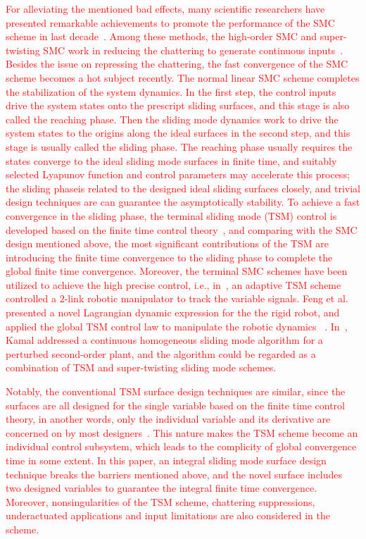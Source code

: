 \documentclass[3p]{elsarticle}
\theoremstyle{plain}
\theoremstyle{remark}
\begin{document}
\textcolor{red}{For alleviating the mentioned bad effects, many scientific researchers have presented remarkable achievements to promote the performance of the SMC scheme in last decade~\cite{zong2013quasi,santiesteban2013time,mu2015continuous,evangelista2013lyapunov,gonzalez2014chattering,dadras2012fractional,zhao2013output}. Among these methods, the high-order SMC and super-twisting SMC work in reducing the chattering to generate continuous inputs~\cite{castillo2015higher,palosz2015laser,edwards2016adaptive,zhao2015finite,liu2015second}. Besides the issue on repressing the chattering, the fast convergence of the SMC scheme becomes a hot subject recently. The normal linear SMC scheme completes the stabilization of the system dynamics. In the first step, the control inputs drive the system states onto the prescript sliding surfaces, and this stage is also called the reaching phase. Then the sliding mode dynamics work to drive the system states to the origins along the ideal surfaces in the second step, and this stage is usually called the sliding phase. The reaching phase  usually requires the states converge to the ideal sliding mode surfaces in finite time, and suitably selected Lyapunov function and control parameters may accelerate this process; the sliding phaseis related to the designed ideal sliding surfaces closely, and trivial design techniques are can guarantee the asymptotically stability. To achieve a fast convergence in the sliding phase, the terminal sliding mode (TSM) control is developed based on the finite time control theory~\cite{haimo1986finite,bhat1997finite}, and comparing with the SMC design mentioned above, the most significant contributions of the TSM are introducing the finite time convergence to the sliding phase to complete the global finite time convergence. Moreover, the terminal SMC schemes have been utilized to achieve the high precise control, i.e., in~\cite{li2015robust}, an adaptive TSM scheme controlled a $2$-link robotic manipulator to track the variable signals. Feng et al. presented a novel Lagrangian dynamic expression for the the rigid robot, and applied the global TSM control law to manipulate the robotic dynamics ~\cite{feng2002non}. In~\cite{kamal2016continuous}, Kamal addressed a continuous homogeneous sliding mode algorithm for a perturbed second-order plant, and the algorithm could be regarded as a combination of TSM and super-twisting sliding mode schemes.}

\textcolor{red}{Notably, the conventional TSM surface design techniques are similar, since the surfaces are all designed for the single variable based on the finite time control theory, in another words, only the individual variable and its derivative are concerned on by most designers~\cite{mu2016switching}. This nature makes the TSM scheme become an individual control subsystem, which leads to the complicity of global convergence time in some extent. In this paper, an integral sliding mode surface design technique breaks the barriers mentioned above, and the novel surface includes two designed variables to guarantee the integral finite time convergence. Moreover, nonsingularities of the TSM scheme, chattering suppressions, underactuated applications and input limitations are also considered in the scheme.}
\end{document}
